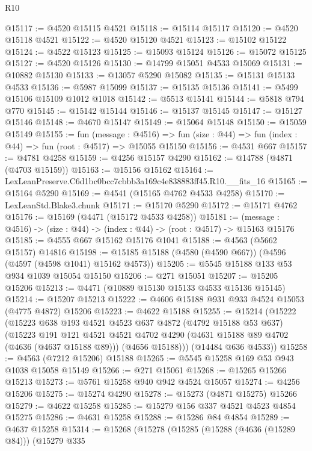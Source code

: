 \begin{lexlean}{R10}
\begin{coremodule}
@15117 := @4520 @15115 @4521
@15118 := @15114 @15117
@15120 := @4520 @15118 @4521
@15122 := @4520 @15120 @4521
@15123 := @15102 @15122
@15124 := @4522 @15123
@15125 := @15093 @15124
@15126 := @15072 @15125
@15127 := @4520 @15126
@15130 := @14799 @15051 @4533 @15069
@15131 := @10882 @15130
@15133 := @13057 @5290 @15082
@15135 := @15131 @15133 @4533
@15136 := @5987 @15099
@15137 := @15135 @15136
@15141 := @5499 @15106 @15109 @1012 @1018
@15142 := @5513 @15141
@15144 := @5818 @794 @770
@15145 := @15142 @15144
@15146 := @15137 @15145
@15147 := @15127 @15146
@15148 := @4670 @15147
@15149 := @15064 @15148
@15150 := @15059 @15149
@15155 := fun (message : @4516) =>
  fun (size : @44) => fun (index : @44) => fun (root : @4517) => @15055 @15150
@15156 := @4531 @667
@15157 := @4781 @4258
@15159 := @4256 @15157 @4290
@15162 := @14788 (@4871 (@4703 @15159))
@15163 := @15156 @15162
@15164 := LexLeanPreserve.C6d1bc0bcc7cbbb3a169c4e838883ff45.R10.__fits_16
@15165 := @15164 @5290
@15169 := @4541 (@15165 @4762 @4533 @4258)
@15170 := LexLeanStd.Blake3.chunk
@15171 := @15170 @5290
@15172 := @15171 @4762
@15176 := @15169 (@4471 (@15172 @4533 @4258))
@15181 := (message : @4516) -> (size : @44) -> (index : @44) -> (root : @4517) -> @15163 @15176
@15185 := @4555 @667 @15162 @15176 @1041
@15188 := @4563 (@5662 @15157) @14816
@15198 := @15185 @15188 (@4580 (@4590 @667)) (@4596 (@4597 (@4598 @1041) @15162 @4573))
@15205 := @5545 @15188 @133 @53 @934 @1039 @15054 @15150
@15206 := @271 @15051
@15207 := @15205 @15206
@15213 := @4471 (@10889 @15130 @15133 @4533 @15136 @15145)
@15214 := @15207 @15213
@15222 := @4606 @15188 @931 @933 @4524 @15053 (@4775 @4872) @15206
@15223 := @4622 @15188
@15255 := @15214
    (@15222
      (@15223
        @638
        @193
        @4521
        @4523
        @637
        @4872
        (@4792 @15188 @53 @637)
        (@15223
          @191
          @121
          @4521
          @4521
          @4702
          @4290
          (@4631 @15188 @89 @4702 (@4636 (@4637 @15188 @89)))
          (@4656 @15188)))
      (@14484 @636 @4533))
@15258 := @4563 (@7212 @15206) @15188
@15265 := @5545 @15258 @169 @53 @943 @1038 @15058 @15149
@15266 := @271 @15061
@15268 := @15265 @15266 @15213
@15273 := @5761 @15258 @940 @942 @4524 @15057
@15274 := @4256 @15206
@15275 := @15274 @4290
@15278 := @15273 (@4871 @15275) @15266
@15279 := @4622 @15258
@15285 := @15279 @156 @337 @4521 @4523 @4854 @15275
@15286 := @4631 @15258
@15288 := @15286 @84 @4854
@15289 := @4637 @15258
@15314 := @15268
    (@15278
      (@15285
        (@15288 (@4636 (@15289 @84)))
        (@15279
          @335

\end{coremodule}
\end{lexlean}
